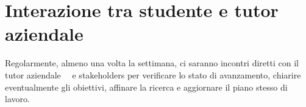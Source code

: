 \section*{Interazione tra studente e tutor aziendale}

Regolarmente, almeno una volta la settimana, ci saranno incontri diretti con il tutor aziendale \nomeTutorAziendale\ \cognomeTutorAziendale\ e stakeholders per verificare lo stato di avanzamento, chiarire eventualmente gli obiettivi, affinare la ricerca e aggiornare il piano stesso di lavoro.
